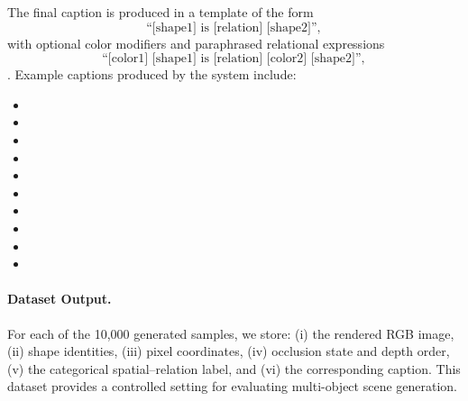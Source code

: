 \documentclass[10pt,twocolumn,letterpaper]{article}
\begin{document}
The final caption is produced in a template of the form
\[
\text{``[shape1] is [relation] [shape2]''},
\]
with optional color modifiers and paraphrased relational expressions
\[
\text{``[color1] [shape1] is [relation] [color2] [shape2]''},
\]
. 
Example captions produced by the system include:
\begin{itemize}
    \item {}
    \item {}
    \item {}
    \item {}
    \item {}
    \item {}
    \item {}
    \item {}
    \item {}
    \item {}
\end{itemize}

\paragraph{Dataset Output.}
For each of the 10{,}000 generated samples, we store:
(i) the rendered RGB image,
(ii) shape identities,
(iii) pixel coordinates,
(iv) occlusion state and depth order,
(v) the categorical spatial–relation label,
and (vi) the corresponding caption.  
This dataset provides a controlled setting for evaluating multi-object scene generation. 
\end{document}
